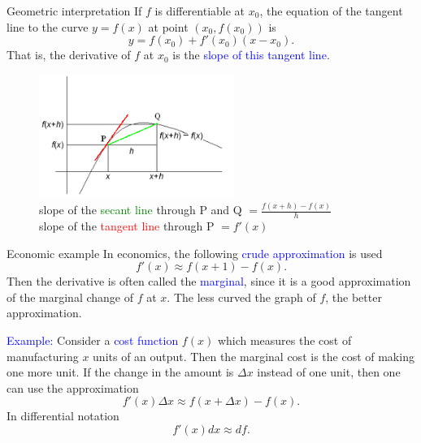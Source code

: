 \documentclass[11pt,aspectratio=169]{beamer}
\begin{document}
\begin{frame}{Geometric interpretation}
If $f$ is differentiable at $x_0$, the equation of the tangent  line
to the curve $y=f(x)$ at point $(x_0, f(x_0))$ is
$$
y=f(x_0)+f'(x_0)(x-x_0).
$$
That is, the derivative of $f$ at $x_0$ is the \textcolor{blue}{slope of this tangent line}.
\begin{figure}
\includegraphics[width=2.5in]{img/derivative} \\
slope of the \textcolor{green}{secant line} through P and Q $=\frac{f(x+h)-f(x)}{h}$\\
slope of the \textcolor{red}{tangent line} through P $=f'(x)$
\end{figure}
\end{frame}


\begin{frame}{Economic example}
In economics, the following \textcolor{blue}{crude approximation} is used
$$
f'(x) \approx f(x+1)-f(x).
$$
Then the derivative is often called the \textcolor{blue}{marginal}, since it is a good approximation of the marginal change of $f$ at $x$. The less curved the graph of $f$, the better approximation.

\vskip 12pt

\textcolor{blue}{Example:} Consider a \textcolor{blue}{cost function} $f(x)$ which measures the cost of manufacturing $x$ units of an output. Then the marginal cost is the cost of making one more unit.
\vskip 12pt
 If the change in the amount is $\Delta x$ instead of one unit, then one can use the approximation
$$
f'(x)\Delta x \approx f(x+\Delta x)-f(x).
$$
In differential notation
$$
f'(x) dx \approx df.
$$
\end{frame}
\end{document}
